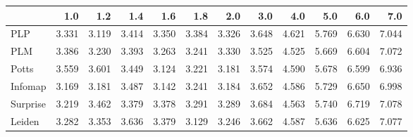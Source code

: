\begin{tabular}{lrrrrrrrrrrr}
\toprule
{} &   1.0 &   1.2 &   1.4 &   1.6 &   1.8 &   2.0 &   3.0 &   4.0 &   5.0 &   6.0 &   7.0 \\
\midrule
PLP      & 3.331 & 3.119 & 3.414 & 3.350 & 3.384 & 3.326 & 3.648 & 4.621 & 5.769 & 6.630 & 7.044 \\
PLM      & 3.386 & 3.230 & 3.393 & 3.263 & 3.241 & 3.330 & 3.525 & 4.525 & 5.669 & 6.604 & 7.072 \\
Potts    & 3.559 & 3.601 & 3.449 & 3.124 & 3.221 & 3.181 & 3.574 & 4.590 & 5.678 & 6.599 & 6.936 \\
Infomap  & 3.169 & 3.181 & 3.487 & 3.142 & 3.241 & 3.184 & 3.652 & 4.586 & 5.729 & 6.650 & 6.998 \\
Surprise & 3.219 & 3.462 & 3.379 & 3.378 & 3.291 & 3.289 & 3.684 & 4.563 & 5.740 & 6.719 & 7.078 \\
Leiden   & 3.282 & 3.353 & 3.636 & 3.379 & 3.129 & 3.246 & 3.662 & 4.587 & 5.636 & 6.625 & 7.077 \\
\bottomrule
\end{tabular}
